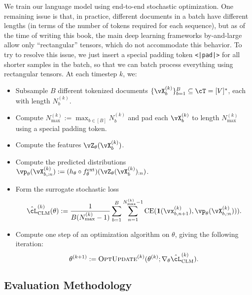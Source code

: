 \documentclass[\toplevelprefix/book-main.tex]{subfiles}
\begin{document}
We train our language model using end-to-end stochastic optimization. One remaining issue is that, in practice, different documents in a batch have different lengths (in terms of the number of tokens required for each sequence), but as of the time of writing this book, the main deep learning frameworks by-and-large allow only ``rectangular'' tensors, which do not accommodate this behavior. To try to resolve this issue, we just insert a special padding token \texttt{<|pad|>} for all shorter samples in the batch, so that we can batch process everything using rectangular tensors. At each timestep \(k\), we:
\begin{itemize}
    \item Subsample \(B\) different tokenized documents \(\{\vX_{b}^{(k)}\}_{b = 1}^{B} \subseteq \cT = [V]^{*}\), each with length \(N_{b}^{(k)}\).
    \item Compute \(N_{\max}^{(k)} := \max_{b \in [B]}N_{b}^{(k)}\) and pad each \(\vX_{b}^{(k)}\) to length \(N_{\max}^{(k)}\) using a special padding token.
    \item Compute the features \(\vZ_{\theta}(\vX_{b}^{(k)})\).
    \item Compute the predicted distributions \(\vp_{\theta}(\vX_{b, :n}^{(k)}) := (h_{\theta} \circ f_{\theta}^{\ext})(\vZ_{\theta}(\vX_{b}^{(k)})_{:n})\).
    \item Form the surrogate stochastic loss 
    \begin{equation}
        \hat{\cL}_{\mathrm{CLM}}^{(k)}(\theta) := \frac{1}{B(N_{\max}^{(k)} - 1)}\sum_{b = 1}^{B}\sum_{n = 1}^{N_{\max}^{(k)}-1}\CE(\vone(\vx_{b, n + 1}^{(k)}), \vp_{\theta}(\vX_{b, :n}^{(k)}))).
    \end{equation}
    \item Compute one step of an optimization algorithm on \(\theta\), giving the following iteration:
    \begin{equation}
        \theta^{(k + 1)} := \textsc{OptUpdate}^{(k)}(\theta^{(k)}; \nabla_{\theta}\hat{\cL}_{\mathrm{CLM}}^{(k)}).
    \end{equation}
\end{itemize}

\subsection{Evaluation Methodology} \label{sub:clm_text_evals}
\end{document}
